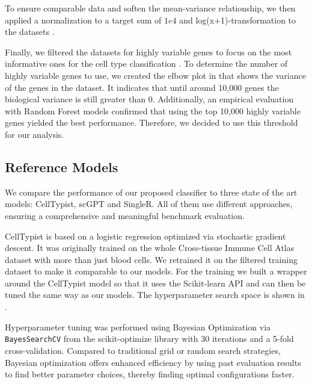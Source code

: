 \documentclass[11pt]{article}
\begin{document}
To ensure comparable data and soften the mean-variance relationship, we then applied a normalization to a target sum of $1e4$ and log(x+1)-transformation to the datasets \cite{luecken_current_2019}.

Finally, we filtered the datasets for highly variable genes to focus on the most informative ones for the cell type classification \cite{scanpy_development_team_preprocessing_2026}. 
To determine the number of highly variable genes to use, we created the elbow plot in  that shows the variance of the genes in the dataset. It indicates that until around 10,000 genes the biological variance is still greater than 0. Additionally, an empirical evaluation with Random Forest models confirmed that using the top 10,000 highly variable genes yielded the best performance. Therefore, we decided to use this threshold for our analysis.


\subsection{Reference Models}\label{sec:methods:reference-models}

We compare the performance of our proposed classifier to three state of the art models: CellTypist, scGPT and SingleR. All of them use different approaches, ensuring a comprehensive and meaningful benchmark evaluation.


CellTypist \cite{dominguez_conde_cross-tissue_2022} is based on a logistic regression optimized via stochastic gradient descent. It was originally trained on the whole Cross-tissue Immune Cell Atlas dataset with more than just blood cells. We retrained it on the filtered training dataset to make it comparable to our models. For the training we built a wrapper around the CellTypist model so that it uses the Scikit-learn API and can then be tuned the same way as our models. The hyperparameter search space is shown in .

Hyperparameter tuning was performed using Bayesian Optimization via \texttt{BayesSearchCV} from the scikit-optimize library \cite{scikit-optimize_contributors_skoptbayessearchcv_2020} with 30 iterations and a 5-fold cross-validation. Compared to traditional grid or random search strategies, Bayesian optimization offers enhanced efficiency by using past evaluation results to find better parameter choices, thereby finding optimal configurations faster. \cite{NIPS2012_05311655}
\end{document}
